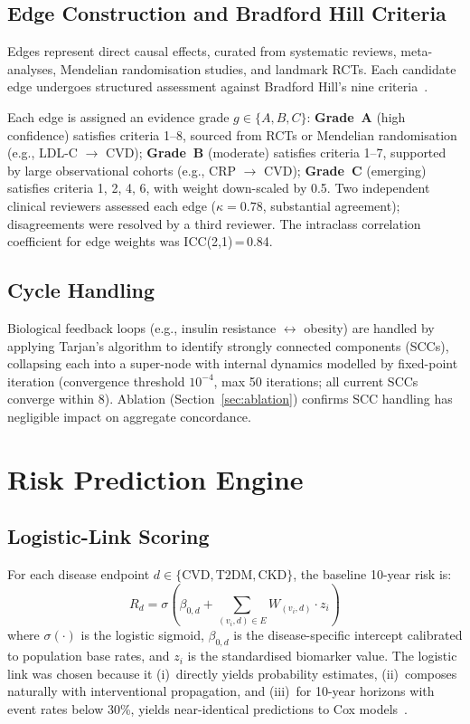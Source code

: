 \documentclass[runningheads]{llncs}
\begin{document}
\subsection{Edge Construction and Bradford Hill Criteria}
\label{sec:edges}

Edges represent direct causal effects, curated from systematic
reviews, meta-analyses, Mendelian randomisation studies, and landmark
RCTs.  Each candidate edge undergoes structured assessment against
Bradford Hill's nine criteria~\cite{hill1965environment}.

Each edge is assigned an evidence grade $g \in \{A, B, C\}$:
\textbf{Grade~A} (high confidence) satisfies criteria 1--8, sourced
from RCTs or Mendelian randomisation (e.g., LDL-C $\rightarrow$ CVD);
\textbf{Grade~B} (moderate) satisfies criteria 1--7, supported by
large observational cohorts (e.g., CRP $\rightarrow$ CVD);
\textbf{Grade~C} (emerging) satisfies criteria 1, 2, 4, 6, with
weight down-scaled by 0.5.  Two independent clinical reviewers
assessed each edge ($\kappa = 0.78$, substantial agreement);
disagreements were resolved by a third reviewer.  The intraclass
correlation coefficient for edge weights was ICC(2,1)\,=\,0.84.

\subsection{Cycle Handling}\label{sec:cycles}

Biological feedback loops (e.g., insulin resistance
$\leftrightarrow$ obesity) are handled by applying Tarjan's algorithm
to identify strongly connected components (SCCs), collapsing each into
a super-node with internal dynamics modelled by fixed-point iteration
(convergence threshold $10^{-4}$, max 50 iterations; all current SCCs
converge within 8).  Ablation (Section~\ref{sec:ablation}) confirms
SCC handling has negligible impact on aggregate concordance.

\section{Risk Prediction Engine}\label{sec:risk}

\subsection{Logistic-Link Scoring}\label{sec:logistic}

For each disease endpoint $d \in \{\text{CVD}, \text{T2DM}, \text{CKD}\}$,
the baseline 10-year risk is:
\begin{equation}\label{eq:risk}
R_d = \sigma\!\left(\beta_{0,d} + \sum_{(v_i, d) \in E} W_{(v_i,d)} \cdot z_i\right)
\end{equation}
where $\sigma(\cdot)$ is the logistic sigmoid, $\beta_{0,d}$ is the
disease-specific intercept calibrated to population base rates, and
$z_i$ is the standardised biomarker value.  The logistic link was
chosen because it (i)~directly yields probability estimates, (ii)~composes
naturally with interventional propagation, and (iii)~for 10-year horizons
with event rates below 30\%, yields near-identical predictions to Cox
models~\cite{dagostino2008}.
\end{document}
